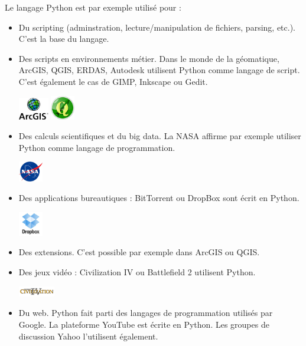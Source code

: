\documentclass[12pt, a4paper]{article}
\begin{document}
Le langage Python est par exemple utilisé pour :
\begin{itemize}
	\item Du scripting (adminstration, lecture/manipulation de fichiers, parsing, etc.). C'est la base du langage.
	\item Des scripts en environnements métier. Dans le monde de la géomatique, ArcGIS, QGIS, ERDAS, Autodesk utilisent Python comme langage de script. C'est également le cas de GIMP, Inkscape ou Gedit.
	\begin{center}
		\includegraphics[width=50px]{img/logo_arcgis.jpeg} \hspace{40px}
		\includegraphics[width=40px]{img/logo_qgis.jpeg}
	\end{center}
	\item Des calculs scientifiques et du big data. La NASA affirme par exemple utiliser Python comme langage de programmation.
	\begin{center}
		\includegraphics[width=40px]{img/logo_nasa.jpeg}
	\end{center}
	\item Des applications bureautiques : BitTorrent ou DropBox sont écrit en Python.
	\begin{center}
		\includegraphics[width=40px]{img/logo_dropbox.jpeg}
	\end{center}
	\item Des extensions. C'est possible par exemple dans ArcGIS ou QGIS.
	\item Des jeux vidéo : Civilization IV ou Battlefield 2 utilisent Python.
	\begin{center}
		\includegraphics[width=60px]{img/logo_civilization4.jpeg}
	\end{center}
	\item Du web. Python fait parti des langages de programmation utilisés par Google. La plateforme YouTube est écrite en Python. Les groupes de discussion Yahoo l'utilisent également.

\end{itemize}
\end{document}
